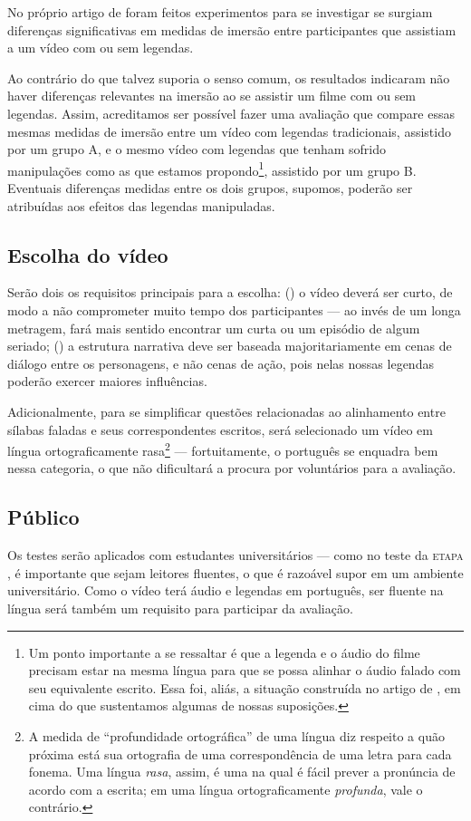 \documentclass[a4paper,11pt,titlepage,singlespacing]{article}
\newcommand{\etapa}[1]{\textsc{etapa \oldstylenums{#1}}}
\newcommand{\num}[1]{(\oldstylenums{#1})}
\begin{document}
No próprio artigo de  foram feitos experimentos para se investigar se surgiam diferenças significativas em medidas de imersão entre participantes que assistiam a um vídeo com ou sem legendas. 

Ao contrário do que talvez suporia o senso comum, os resultados indicaram não haver diferenças relevantes na imersão ao se assistir um filme com ou sem legendas. Assim, acreditamos ser possível fazer uma avaliação que compare essas mesmas medidas de imersão entre um vídeo com legendas tradicionais, assistido por um grupo A, e o mesmo vídeo com legendas que tenham sofrido manipulações como as que estamos propondo\footnote{Um ponto importante a se ressaltar é que a legenda e o áudio do filme precisam estar na mesma língua para que se possa alinhar o áudio falado com seu equivalente escrito. Essa foi, aliás, a situação construída no artigo de , em cima do que sustentamos algumas de nossas suposições.}, assistido por um grupo B. Eventuais diferenças medidas entre os dois grupos, supomos, poderão ser atribuídas aos efeitos das legendas manipuladas.

\subsection*{Escolha do vídeo}

Serão dois os requisitos principais para a escolha: \num{1} o vídeo deverá ser curto, de modo a não comprometer muito tempo dos participantes — ao invés de um longa metragem, fará mais sentido encontrar um curta ou um episódio de algum seriado; \num{2} a estrutura narrativa deve ser baseada majoritariamente em cenas de diálogo entre os personagens, e não cenas de ação, pois nelas nossas legendas poderão exercer maiores influências.

Adicionalmente, para se simplificar questões relacionadas ao alinhamento entre sílabas faladas e seus correspondentes escritos, será selecionado um vídeo em língua ortograficamente rasa\footnote{A medida de ``profundidade ortográfica'' de uma língua diz respeito a quão próxima está sua ortografia de uma correspondência de uma letra para cada fonema. Uma língua \textit{rasa}, assim, é uma na qual é fácil prever a pronúncia de acordo com a escrita; em uma língua ortograficamente \textit{profunda}, vale o contrário.} — fortuitamente, o português se enquadra bem nessa categoria, o que não dificultará a procura por voluntários para a avaliação.

\subsection*{Público}
Os testes serão aplicados com estudantes universitários — como no teste da \etapa{2}, é importante que sejam leitores fluentes, o que é razoável supor em um ambiente universitário. Como o vídeo terá áudio e legendas em português, ser fluente na língua será também um requisito para participar da avaliação. 
\end{document}
